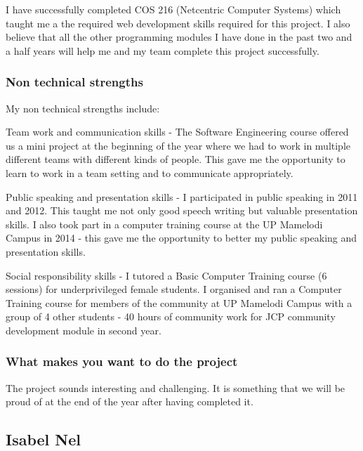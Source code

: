 \documentclass[hidelinks, 12pt, oneside]{article}
\begin{document}
I have successfully completed COS 216 (Netcentric Computer Systems)  which taught me a the required web development skills required for this project. I also believe that all the other programming modules I have done in the past two and a half years will help me and my team complete this project successfully.

\subsubsection{Non technical strengths}

My non technical strengths include: 

Team work and communication skills - The Software Engineering course offered us a mini project at the beginning of the year where we had to work in multiple different teams with different kinds of people. This gave me the opportunity to learn to work in a team setting and to communicate appropriately.
 
Public speaking and presentation skills - I participated in public speaking in 2011 and 2012. This taught me not only good speech writing but valuable presentation skills.
I also took part in a computer training course at the UP Mamelodi Campus in 2014 - this gave me the opportunity to better my public speaking and presentation skills.

Social responsibility skills - I tutored a Basic Computer Training course (6 sessions) for underprivileged female students.
I organised and ran a Computer Training course for members of the community at UP Mamelodi Campus with a group of 4 other students - 40 hours of community work for JCP community development module in second year.

\subsubsection{What makes you want to do the project}

The project sounds interesting and challenging. It is something that we will be proud of at the end of the year after having completed it.

\subsection{Isabel Nel}
\end{document}
